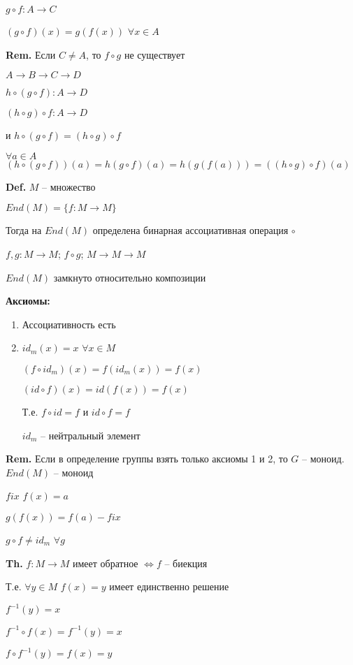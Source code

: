 \documentclass[14pt, letter paper]{article}
\begin{document}
$g \circ f : A \rightarrow C$

$(g \circ f)(x) = g(f(x))$ $\forall x \in A$

\textbf{Rem.} Если $C \neq A$, то $f \circ g$ не существует

$A \rightarrow B \rightarrow C \rightarrow D$

$h \circ (g \circ f) : A \rightarrow D$

$(h \circ g) \circ f : A \rightarrow D$

и $h \circ (g \circ f) = (h \circ g) \circ f$

$\forall a \in A$ $(h \circ (g \circ f))(a) = h(g \circ f)(a) = h(g(f(a))) = ((h \circ g) \circ f)(a)$

\textbf{Def.} $M$ -- множество

$End(M) = \{ f : M \rightarrow M\}$

Тогда на $End(M)$ определена бинарная ассоциативная операция $\circ$

$f, g : M \rightarrow M$; $f \circ g$; $M \rightarrow M \rightarrow M$

$End(M)$ замкнуто относительно композиции

\textbf{Аксиомы:}

\begin{enumerate}
    \item Ассоциативность есть
    \item $id_m(x) = x$ $\forall x \in M$

    $(f \circ id_m)(x) = f(id_m(x)) = f(x)$

    $(id \circ f)(x) = id(f(x)) = f(x)$

    Т.е. $f \circ id = f$ и $id \circ f = f$

    $id_m$ -- нейтральный элемент
\end{enumerate}

\textbf{Rem.} Если в определение группы взять только аксиомы 1 и 2, то $G$ -- моноид. $End(M)$ -- моноид

$fix$ $f(x) = a$

$g(f(x)) = f(a) - fix$

$g \circ f \neq id_m$ $\forall g$

\textbf{Th.} $f : M \rightarrow M$ имеет обратное $\Leftrightarrow f$ -- биекция

Т.е. $\forall y \in M$ $f(x) = y$ имеет единственно решение

$f^{-1}(y) = x$

$f^{-1} \circ f(x) = f^{-1}(y) = x$

$f \circ f^{-1}(y) = f(x) = y$
\end{document}
